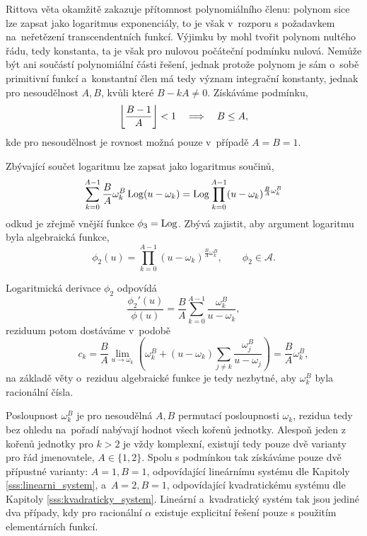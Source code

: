 Rittova věta okamžitě zakazuje přítomnost polynomiálního členu: polynom sice lze zapsat jako logaritmus exponenciály, to je však v~rozporu s požadavkem na~neřetězení transcendentních funkcí. Výjimku by mohl tvořit polynom nultého řádu, tedy konstanta, ta je však pro nulovou počáteční podmínku nulová. Nemůže být ani součástí polynomiální části řešení, jednak protože polynom je sám o~sobě primitivní funkcí a~konstantní člen má tedy význam integrační konstanty, jednak pro nesoudělnost $A,B$, kvůli které $B-kA\neq0$. Získáváme podmínku,
\begin{equation}\label{eq:condition_coprime_inequality}
    \left\lfloor\frac{B-1}{A}\right\rfloor<1\quad\Longrightarrow\quad B\le A,
\end{equation}
kde pro nesoudělnost je rovnost možná pouze v~případě $A=B=1$. 

Zbývající součet logaritmu lze zapsat jako logaritmus součinů,
\begin{equation}
    \sum_{k=0}^{A-1}\frac{B}{A}\omega_k^B\operatorname{Log}(u-\omega_k)=\operatorname{Log}\prod_{k=0}^{A-1}(u-\omega_k)^{\frac{B}{A}\omega_k^B}
\end{equation}
odkud je zřejmě vnější funkce $\phi_3=\operatorname{Log}$. Zbývá zajistit, aby argument logaritmu byla algebraická funkce,
\begin{equation}
    \phi_2(u)=\prod_{k=0}^{A-1}(u-\omega_k)^{\frac{B}{A}\omega_k^B},\qquad \phi_2\in\mathcal{A}.
\end{equation}

Logaritmická derivace $\phi_2$ odpovídá 
\begin{equation}
    \frac{\phi_2'(u)}{\phi(u)}=\frac{B}{A}\sum_{k=0}^{A-1}\frac{\omega_k^B}{u-\omega_k},
\end{equation}
reziduum potom dostáváme v~podobě
\begin{equation}
    \qquad c_k=\frac{B}{A}\lim_{u\to \omega_k}\left(\omega_k^B+(u-\omega_k)\sum_{j\neq k}\frac{\omega_j^B}{u-\omega_j}\right)=\frac{B}{A}\omega_k^B,
\end{equation}    
na základě věty o~reziduu algebraické funkce je tedy nezbytné, aby $\omega_k^B$ byla racionální čísla. 

Posloupnost $\omega_k^B$ je pro nesoudělná $A,B$ permutací posloupnosti $\omega_k$, rezidua tedy bez ohledu na~pořadí nabývají hodnot všech kořenů jednotky. Alespoň jeden z kořenů jednotky pro $k>2$ je vždy komplexní, existují tedy pouze dvě varianty pro řád jmenovatele, $A\in\{1,2\}$. Spolu s podmínkou  tak získáváme pouze dvě přípustné varianty: $A=1, B=1$, odpovídající lineárnímu systému dle Kapitoly \ref{sss:linearni_system}, a~$A=2, B=1$, odpovídající kvadratickému systému dle Kapitoly \ref{sss:kvadraticky_system}. Lineární a~kvadratický systém tak jsou jediné dva případy, kdy pro racionální $\alpha$ existuje explicitní řešení pouze s použitím elementárních funkcí.


